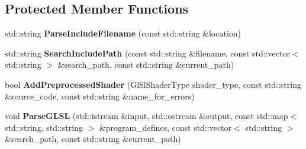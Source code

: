 \subsection*{Protected Member Functions}
\begin{DoxyCompactItemize}
\item 
std\+::string {\bfseries Parse\+Include\+Filename} (const std\+::string \&location)\hypertarget{classpangolin_1_1_gl_sl_program_ab3ddbf504d2c3f9027e11853f22928e1}{}\label{classpangolin_1_1_gl_sl_program_ab3ddbf504d2c3f9027e11853f22928e1}

\item 
std\+::string {\bfseries Search\+Include\+Path} (const std\+::string \&filename, const std\+::vector$<$ std\+::string $>$ \&search\+\_\+path, const std\+::string \&current\+\_\+path)\hypertarget{classpangolin_1_1_gl_sl_program_af8d35348ed13a2bcae13f489b1c957ba}{}\label{classpangolin_1_1_gl_sl_program_af8d35348ed13a2bcae13f489b1c957ba}

\item 
bool {\bfseries Add\+Preprocessed\+Shader} (Gl\+Sl\+Shader\+Type shader\+\_\+type, const std\+::string \&source\+\_\+code, const std\+::string \&name\+\_\+for\+\_\+errors)\hypertarget{classpangolin_1_1_gl_sl_program_adedca316d4367dfa2ab6c11ff6ca82cb}{}\label{classpangolin_1_1_gl_sl_program_adedca316d4367dfa2ab6c11ff6ca82cb}

\item 
void {\bfseries Parse\+G\+L\+SL} (std\+::istream \&input, std\+::ostream \&output, const std\+::map$<$ std\+::string, std\+::string $>$ \&program\+\_\+defines, const std\+::vector$<$ std\+::string $>$ \&search\+\_\+path, const std\+::string \&current\+\_\+path)\hypertarget{classpangolin_1_1_gl_sl_program_a6e2ace720497d9dc3d8bda29d0d2d9b6}{}\label{classpangolin_1_1_gl_sl_program_a6e2ace720497d9dc3d8bda29d0d2d9b6}

\end{DoxyCompactItemize}
